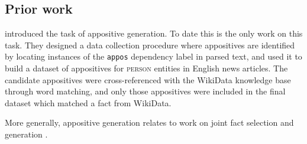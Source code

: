 \documentclass[11pt]{article}
\begin{document}
\subsection{Prior work}
 introduced the task of appositive generation. To date this is the only work on this task. They designed a data collection procedure where appositives are identified by locating instances of the \texttt{appos} dependency label \cite{nivre-etal-2020-universal} in parsed text, and used it to build a dataset of appositives for \textsc{person} entities in English news articles. The candidate appositives were cross-referenced with the WikiData knowledge base \cite{10.1145/2629489} through word matching, and only those appositives were included in the final dataset which matched a fact from WikiData.

More generally, appositive generation relates to work on joint fact selection and generation \cite{liang-etal-2009-learning,kim-mooney-2010-generative,angeli-etal-2010-simple,Konstas2013AGM}. 
\end{document}
